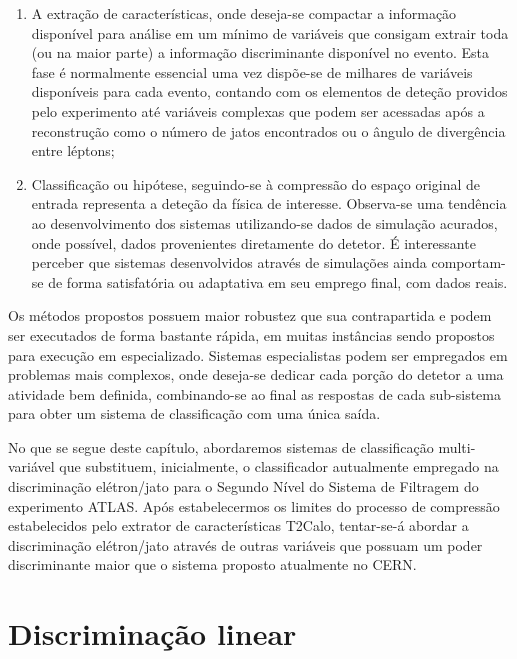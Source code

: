 \begin{enumerate}
\item A extração de características, onde deseja-se compactar a informação
disponível para análise em um mínimo de variáveis que consigam extrair toda
(ou na maior parte) a informação discriminante disponível no evento. Esta fase
é normalmente essencial uma vez dispõe-se de milhares de variáveis disponíveis
para cada evento, contando com os elementos de deteção providos pelo
experimento até variáveis complexas que podem ser acessadas após a
reconstrução como o número de jatos encontrados ou o ângulo de divergência
entre léptons;
\item Classificação ou hipótese, seguindo-se à compressão do espaço original
de entrada representa a deteção da física de interesse. Observa-se uma
tendência ao desenvolvimento dos sistemas utilizando-se dados de simulação
acurados, onde possível, dados provenientes diretamente do detetor. É
interessante perceber que sistemas desenvolvidos através de simulações ainda
comportam-se de forma satisfatória ou adaptativa em seu emprego final, com
dados reais.
\end{enumerate}

Os métodos propostos possuem maior robustez que sua contrapartida e podem ser
executados de forma bastante rápida, em muitas instâncias sendo propostos para
execução em  especializado. Sistemas especialistas podem ser
empregados em problemas mais complexos, onde deseja-se dedicar cada porção do
detetor a uma atividade bem definida, combinando-se ao final as respostas de
cada sub-sistema para obter um sistema de classificação com uma única saída.

No que se segue deste capítulo, abordaremos sistemas de classificação
multi-variável que substituem, inicialmente, o classificador autualmente
empregado na discriminação elétron/jato para o Segundo Nível do Sistema de
Filtragem do experimento ATLAS. Após estabelecermos os limites do processo de
compressão estabelecidos pelo extrator de características T2Calo, tentar-se-á
abordar a discriminação elétron/jato através de outras variáveis que possuam
um poder discriminante maior que o sistema proposto atualmente no CERN.

\section{Discriminação linear}
\label{sec:lms}

